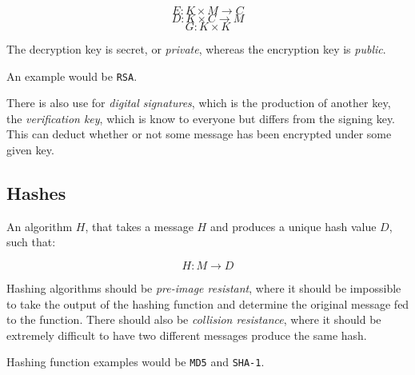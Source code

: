 \documentclass{article}
\begin{document}
\[ E : K \times M \rightarrow C\]
\[ D : K \times C \rightarrow M\]
\[ G : K \times K \]

The decryption key is secret, or \textit{private}, whereas the encryption key is \textit{public}.

An example would be \texttt{RSA}.
 
There is also use for \textit{digital signatures}, which is the production of another key, the \textit{verification key}, which is know to everyone but differs from the signing key. This can deduct whether or not some message has been encrypted under some given key.

\subsection{Hashes}

An algorithm $H$, that takes a message $H$ and produces a unique hash value $D$, such that:

\[ H : M \rightarrow D\]

Hashing algorithms should be \textit{pre-image resistant}, where it should be impossible to take the output of the hashing function and determine the original message fed to the function. There should also be \textit{collision resistance}, where it should be extremely difficult to have two different messages produce the same hash.

Hashing function examples would be \texttt{MD5} and \texttt{SHA-1}.
\end{document}
